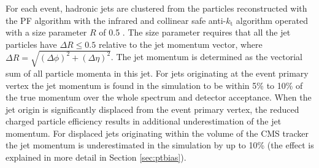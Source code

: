 For each event, hadronic jets are clustered from the particles reconstructed with the PF algorithm
 with the infrared and collinear safe
 anti-$k_\mathrm{t}$ algorithm 
operated with a size parameter $R$ of 0.5 \cite{Cacciari:2008gp}. The size parameter requires that all the jet 
particles have $\Delta R \leq 0.5$ relative to the jet momentum vector, where
 $\Delta R=\sqrt{(\Delta\phi)^2 + (\Delta\eta)^2}$. 
The jet momentum is determined as the vectorial sum of all particle momenta in this jet.
For jets originating at the event primary vertex the jet momentum is found in the simulation to be within 5\% to 10\% of the true momentum over 
the whole \pt spectrum and detector acceptance. 
When the jet origin is significantly displaced from the event primary vertex, the reduced 
charged particle efficiency results in additional underestimation of the jet momentum. 
For displaced jets originating within the volume of the CMS tracker the jet momentum is underestimated in the simulation by up to 10\% (the effect is explained in more detail in Section \ref{sec:ptbias}).

